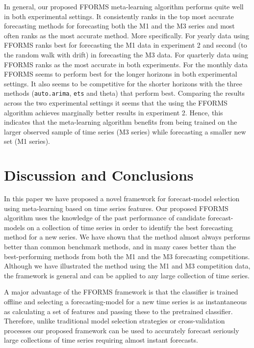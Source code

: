 \documentclass[11pt,a4paper,]{article}
\theoremstyle{definition}
\theoremstyle{definition}
\theoremstyle{definition}
\theoremstyle{remark}
\begin{document}
In general, our proposed FFORMS meta-learning algorithm performs quite
well in both experimental settings. It consistently ranks in the top
most accurate forecasting methods for forecasting both the M1 and the M3
series and most often ranks as the most accurate method. More
specifically. For yearly data using FFORMS ranks best for forecasting
the M1 data in experiment 2 and second (to the random walk with drift)
in forecasting the M3 data. For quarterly data using FFORMS ranks as the
most accurate in both experiments. For the monthly data FFORMS seems to
perform best for the longer horizons in both experimental settings. It
also seems to be competitive for the shorter horizons with the three
methods (\texttt{auto.arima}, \texttt{ets} and theta) that perform best.
Comparing the results across the two experimental settings it seems that
the using the FFORMS algorithm achieves marginally better results in
experiment 2. Hence, this indicates that the meta-learning algorithm
benefits from being trained on the larger observed sample of time series
(M3 series) while forecasting a smaller new set (M1 series).

\hypertarget{discussion}{%
\section{Discussion and Conclusions}\label{discussion}}

In this paper we have proposed a novel framework for forecast-model
selection using meta-learning based on time series features. Our
proposed FFORMS algorithm uses the knowledge of the past performance of
candidate forecast-models on a collection of time series in order to
identify the best forecasting method for a new series. We have shown
that the method almost always performs better than common benchmark
methods, and in many cases better than the best-performing methods from
both the M1 and the M3 forecasting competitions. Although we have
illustrated the method using the M1 and M3 competition data, the
framework is general and can be applied to any large collection of time
series.

A major advantage of the FFORMS framework is that the classifier is
trained offline and selecting a forecasting-model for a new time series
is as instantaneous as calculating a set of features and passing these
to the pretrained classifier. Therefore, unlike traditional model
selection strategies or cross-validation processes our proposed
framework can be used to accurately forecast seriously large collections
of time series requiring almost instant forecasts.
\end{document}

